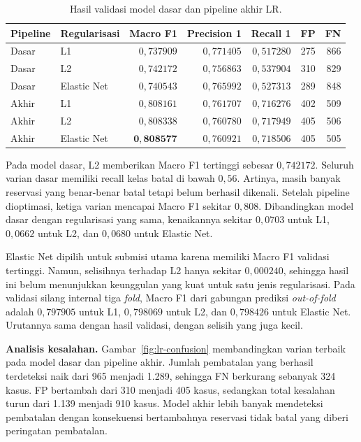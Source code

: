 \begin{table}[htbp]
    \centering
    \caption{Hasil validasi model dasar dan pipeline akhir LR.}
    \label{tab:lr-results}
    \begin{tabular}{llrrrrr}
        \toprule
        Pipeline & Regularisasi & Macro F1              & Precision 1  & Recall 1     & FP  & FN  \\
        \midrule
        Dasar    & L1           & $0{,}737909$          & $0{,}771405$ & $0{,}517280$ & 275 & 866 \\
        Dasar    & L2           & $0{,}742172$          & $0{,}756863$ & $0{,}537904$ & 310 & 829 \\
        Dasar    & Elastic Net  & $0{,}740543$          & $0{,}765992$ & $0{,}527313$ & 289 & 848 \\
        \midrule
        Akhir    & L1           & $0{,}808161$          & $0{,}761707$ & $0{,}716276$ & 402 & 509 \\
        Akhir    & L2           & $0{,}808338$          & $0{,}760780$ & $0{,}717949$ & 405 & 506 \\
        Akhir    & Elastic Net  & $\mathbf{0{,}808577}$ & $0{,}760921$ & $0{,}718506$ & 405 & 505 \\
        \bottomrule
    \end{tabular}
\end{table}

Pada model dasar, L2 memberikan Macro F1 tertinggi sebesar $0{,}742172$. Seluruh varian dasar memiliki recall kelas batal di bawah $0{,}56$. Artinya, masih banyak reservasi yang benar-benar batal tetapi belum berhasil dikenali. Setelah pipeline dioptimasi, ketiga varian mencapai Macro F1 sekitar $0{,}808$. Dibandingkan model dasar dengan regularisasi yang sama, kenaikannya sekitar $0{,}0703$ untuk L1, $0{,}0662$ untuk L2, dan $0{,}0680$ untuk Elastic Net.

Elastic Net dipilih untuk submisi utama karena memiliki Macro F1 validasi tertinggi. Namun, selisihnya terhadap L2 hanya sekitar $0{,}000240$, sehingga hasil ini belum menunjukkan keunggulan yang kuat untuk satu jenis regularisasi. Pada validasi silang internal tiga \textit{fold}, Macro F1 dari gabungan prediksi \textit{out-of-fold} adalah $0{,}797905$ untuk L1, $0{,}798069$ untuk L2, dan $0{,}798426$ untuk Elastic Net. Urutannya sama dengan hasil validasi, dengan selisih yang juga kecil.

\textbf{Analisis kesalahan.}
Gambar~\ref{fig:lr-confusion} membandingkan varian terbaik pada model dasar dan pipeline akhir. Jumlah pembatalan yang berhasil terdeteksi naik dari 965 menjadi 1.289, sehingga FN berkurang sebanyak 324 kasus. FP bertambah dari 310 menjadi 405 kasus, sedangkan total kesalahan turun dari 1.139 menjadi 910 kasus. Model akhir lebih banyak mendeteksi pembatalan dengan konsekuensi bertambahnya reservasi tidak batal yang diberi peringatan pembatalan.

